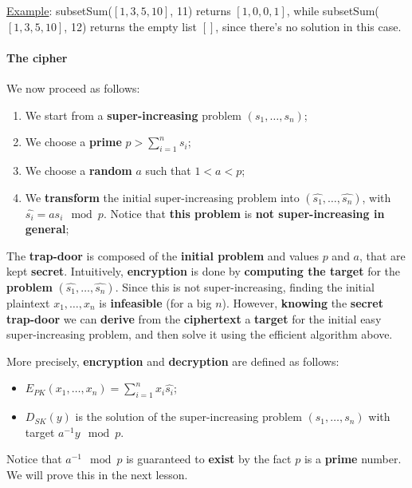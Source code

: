 
\underline{Example}: subsetSum($[1,3,5,10]$, 11) returns $[1, 0, 0, 1]$, while subsetSum($[1,3,5,10]$, 12) returns the empty list $[]$, since there's no solution in this case.

\paragraph{The cipher}
We now proceed as follows:

\begin{enumerate}
    \item We start from a \textbf{super-increasing} problem $(s_1,\ldots,s_n)$;
    \item We choose a \textbf{prime} $p > \sum_{i=1}^{n}{s_i}$;
    \item We choose a \textbf{random} $a$ such that $1 < a < p$;
    \item We \textbf{transform} the initial super-increasing problem into $(\hat{s_1}, \ldots, \hat{s_n})$, with $\hat{s_i} = a s_i \mod p$. Notice that \textbf{this problem} is \textbf{not super-increasing in general};
\end{enumerate}

The \textbf{trap-door} is composed of the \textbf{initial problem} and values $p$ and $a$, that are kept \textbf{secret}. Intuitively, \textbf{encryption} is done by \textbf{computing the target} for the \textbf{problem} $(\hat{s_1}, \ldots, \hat{s_n})$. Since this is not super-increasing, finding the initial plaintext $x_1, \ldots, x_n$ is \textbf{infeasible} (for a big $n$). However, \textbf{knowing} the \textbf{secret trap-door} we can \textbf{derive} from the \textbf{ciphertext} a \textbf{target} for the initial easy super-increasing problem, and then solve it using the efficient algorithm above. 

More precisely, \textbf{encryption} and \textbf{decryption} are defined as follows:

\begin{itemize}
    \item $E_{PK}(x_1, \ldots, x_n) = \sum_{i=1}^{n}{x_i \hat{s_i}}$;
    \item $D_{SK}(y)$ is the solution of the super-increasing problem $(s_1,\ldots,s_n)$ with target $a^{-1} y \mod p$.
\end{itemize}

Notice that $a^{-1} \mod p$ is guaranteed to \textbf{exist} by the fact $p$ is a \textbf{prime} number. We will prove this in the next lesson. 

